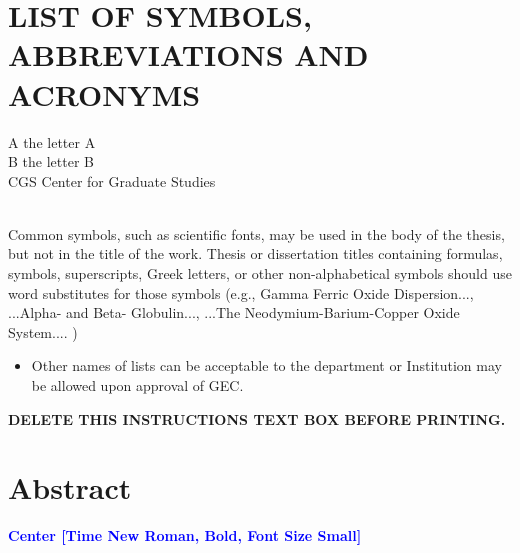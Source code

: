 \documentclass{article}
\begin{document}
\chapter*{LIST OF SYMBOLS, ABBREVIATIONS AND ACRONYMS}
A	the letter A\\
B	the letter B\\
CGS	Center for Graduate Studies\\~\\

\begin{tcolorbox}[enhanced jigsaw,
    sharp corners,
    boxrule=0.5pt, 
    colback=blue!30!white,   
    borderline={0.5pt}{-2pt}{black,solid} %
 ]
 \begin{justify}
Common symbols, such as scientific fonts, may be used in the body of the thesis, but not in the title of the work. Thesis or dissertation titles containing formulas, symbols, superscripts, Greek letters, or other non-alphabetical symbols should use word substitutes for those symbols (e.g.,  Gamma Ferric Oxide Dispersion..., ...Alpha- and Beta-  Globulin..., ...The Neodymium-Barium-Copper Oxide System.... )
\begin{itemize}
    \item Other names of lists can be acceptable to the department or Institution may be allowed upon approval of GEC.
\end{itemize}
{\bf DELETE THIS INSTRUCTIONS TEXT BOX BEFORE PRINTING.}
 \end{justify}
\end{tcolorbox}
\newpage
{}
\chapter*{Abstract}
\begin{center}
    {\small \bf \textcolor{blue}{Center [Time New Roman, Bold, Font Size Small]}}\\
\end{center}
\end{document}
